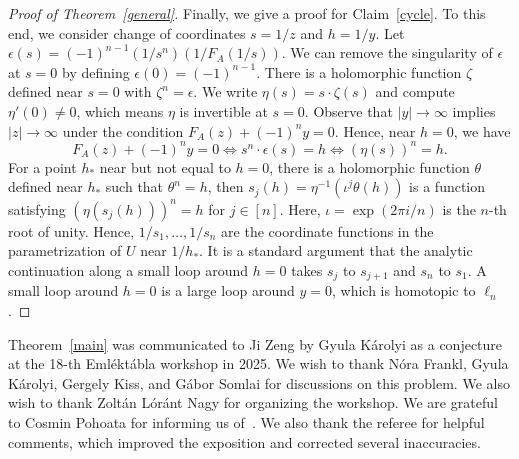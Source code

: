 \documentclass[11pt]{article}
\theoremstyle{definition}
\begin{document}
\begin{proof}[Proof of Theorem~\ref{general}]
  Finally, we give a proof for Claim~\ref{cycle}. To this end, we consider change of coordinates $s = 1/z$ and $h = 1/y$. Let $\epsilon(s) = (-1)^{n-1}  (1/s^n) (1/F_A(1/s))$. We can remove the singularity of $\epsilon$ at $s=0$ by defining $\epsilon(0) = (-1)^{n-1}$. There is a holomorphic function $\zeta$ defined near $s=0$ with $\zeta^n = \epsilon$. We write $\eta(s) = s \cdot \zeta(s)$ and compute $\eta'(0) \neq 0$, which means $\eta$ is invertible at $s=0$. Observe that $|y| \to \infty$ implies $|z| \to \infty$ under the condition $F_A(z) + (-1)^n y = 0$. Hence, near $h=0$, we have
  \begin{equation*}
    F_A(z) + (-1)^n y = 0 \iff s^n \cdot \epsilon(s) = h \iff (\eta(s))^n = h.
  \end{equation*} For a point $h_\ast$ near but not equal to $h=0$, there is a holomorphic function $\theta$ defined near $h_\ast$ such that $\theta^n = h$, then $s_j(h) = \eta^{-1}(\iota^j \theta(h))$ is a function satisfying $ (\eta(s_j(h)))^n = h$ for $j \in [n]$. Here, $\iota = \exp(2\pi i/n)$ is the $n$-th root of unity. Hence, $1/s_1,\dots,1/s_n$ are the coordinate functions in the parametrization of $U$ near $1/h_\ast$. It is a standard argument that the analytic continuation along a small loop around $h=0$ takes $s_j$ to $s_{j+1}$ and $s_n$ to $s_1$. A small loop around $h=0$ is a large loop around $y=0$, which is homotopic to $\ell_n$.
\end{proof}

\medskip
{} Theorem~\ref{main} was communicated to Ji Zeng by Gyula Károlyi as a conjecture at the 18-th Emléktábla workshop in 2025. We wish to thank Nóra Frankl, Gyula Károlyi, Gergely Kiss, and Gábor Somlai for discussions on this problem. We also wish to thank Zoltán Lóránt Nagy for organizing the workshop. We are grateful to Cosmin Pohoata for informing us of~\cite{pawlowski2024}. We also thank the referee for helpful comments, which improved the exposition and corrected several inaccuracies.


{\footnotesize}
\end{document}
